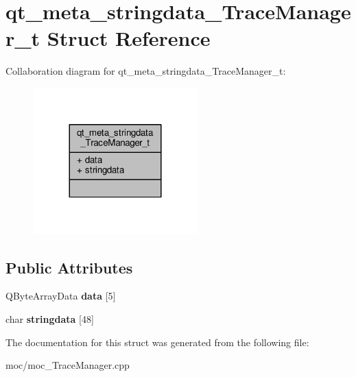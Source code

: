 \hypertarget{structqt__meta__stringdata___trace_manager__t}{\section{qt\-\_\-meta\-\_\-stringdata\-\_\-\-Trace\-Manager\-\_\-t Struct Reference}
\label{structqt__meta__stringdata___trace_manager__t}
}


Collaboration diagram for qt\-\_\-meta\-\_\-stringdata\-\_\-\-Trace\-Manager\-\_\-t\-:
\nopagebreak
\begin{figure}[H]
\begin{center}
\leavevmode
\includegraphics[width=180pt]{structqt__meta__stringdata___trace_manager__t__coll__graph}
\end{center}
\end{figure}
\subsection*{Public Attributes}
\begin{DoxyCompactItemize}
\item 
\hypertarget{structqt__meta__stringdata___trace_manager__t_add1a8c5ac0ef082b3cf811a3b76a6a22}{Q\-Byte\-Array\-Data {\bfseries data} \mbox{[}5\mbox{]}}\label{structqt__meta__stringdata___trace_manager__t_add1a8c5ac0ef082b3cf811a3b76a6a22}

\item 
\hypertarget{structqt__meta__stringdata___trace_manager__t_a3d5cb5166b40f1fc2ff68f1d9e7dfcf3}{char {\bfseries stringdata} \mbox{[}48\mbox{]}}\label{structqt__meta__stringdata___trace_manager__t_a3d5cb5166b40f1fc2ff68f1d9e7dfcf3}

\end{DoxyCompactItemize}


The documentation for this struct was generated from the following file\-:\begin{DoxyCompactItemize}
\item 
moc/moc\-\_\-\-Trace\-Manager.\-cpp\end{DoxyCompactItemize}

